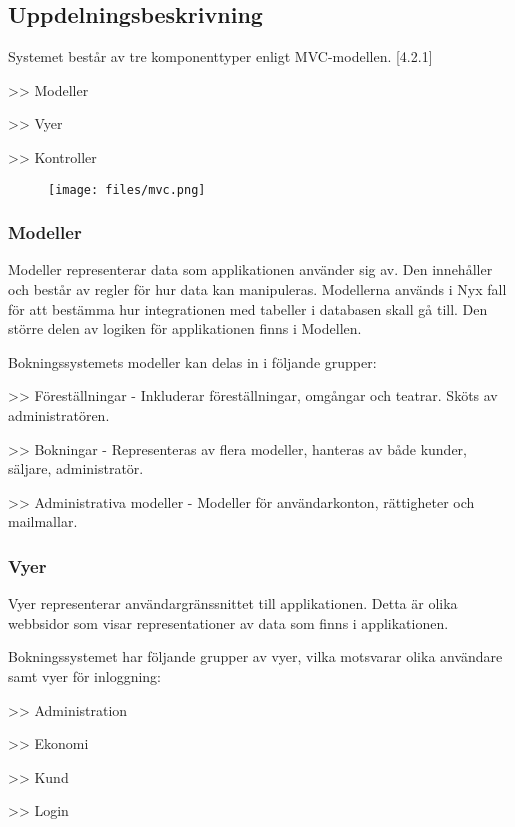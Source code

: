 \documentclass[a4paper, twoside, 11pt, titlepage]{article}
\begin{document}
	\subsection{Uppdelningsbeskrivning}


	Systemet består av tre komponenttyper enligt MVC-modellen. [4.2.1]

	>> Modeller

	>> Vyer

	>> Kontroller

	\begin{figure}[ht] \centering \texttt{[image: files/mvc.png]} \end{figure} \FloatBarrier

		\subsubsection{Modeller}


		Modeller representerar data som applikationen använder sig av.  Den innehåller och består av regler för hur data kan manipuleras. Modellerna används i Nyx fall för att bestämma hur integrationen med tabeller i databasen skall gå till.  Den större delen av logiken för applikationen finns i Modellen.

		Bokningssystemets modeller kan delas in i följande grupper:

		>> Föreställningar - Inkluderar föreställningar, omgångar och teatrar. Sköts av administratören.

		>> Bokningar - Representeras av flera modeller, hanteras av både kunder, säljare, administratör.

		>> Administrativa modeller - Modeller för användarkonton, rättigheter och mailmallar.

		\subsubsection{Vyer}


		Vyer representerar användargränssnittet till applikationen. Detta är olika webbsidor som visar representationer av data som finns i applikationen.

		Bokningssystemet har följande grupper av vyer, vilka motsvarar olika användare samt vyer för inloggning:

		>> Administration

		>> Ekonomi

		>> Kund

		>> Login
\end{document}
